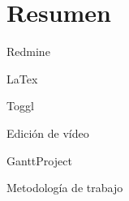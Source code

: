 \documentclass[a4paper,10pt]{scrartcl}
\begin{document}
\section{Resumen}

\begin{list}{}{}
	
	\item Redmine 
	
	\item LaTex
	
	\item Toggl
	
	\item Edición de vídeo
	
	\item GanttProject
	
	\item Metodología de trabajo
	
\end{list}





\end{document}
